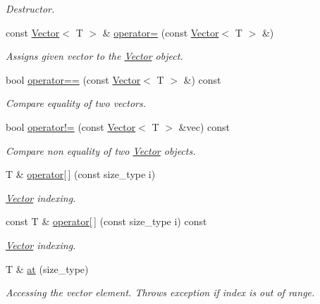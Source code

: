 \begin{DoxyCompactItemize}
\begin{DoxyCompactList}\small\item\em Destructor. \end{DoxyCompactList}\item 
const \hyperlink{classtasks_1_1Vector}{Vector}$<$ T $>$ \& \hyperlink{classtasks_1_1Vector_a20c8cebda6af75951f3c940aff2ccddc}{operator=} (const \hyperlink{classtasks_1_1Vector}{Vector}$<$ T $>$ \&)
\begin{DoxyCompactList}\small\item\em Assigns given vector to the \hyperlink{classtasks_1_1Vector}{Vector} object. \end{DoxyCompactList}\item 
bool \hyperlink{classtasks_1_1Vector_a2f137101daada599ad565736783a3058}{operator==} (const \hyperlink{classtasks_1_1Vector}{Vector}$<$ T $>$ \&) const 
\begin{DoxyCompactList}\small\item\em Compare equality of two vectors. \end{DoxyCompactList}\item 
bool \hyperlink{classtasks_1_1Vector_a74bf7af865841aa86df2c56193514099}{operator!=} (const \hyperlink{classtasks_1_1Vector}{Vector}$<$ T $>$ \&vec) const 
\begin{DoxyCompactList}\small\item\em Compare non equality of two \hyperlink{classtasks_1_1Vector}{Vector} objects. \end{DoxyCompactList}\item 
T \& \hyperlink{classtasks_1_1Vector_a78695c117ca574acbd649a56a88e3a96}{operator\mbox{[}$\,$\mbox{]}} (const size\+\_\+type i)
\begin{DoxyCompactList}\small\item\em \hyperlink{classtasks_1_1Vector}{Vector} indexing. \end{DoxyCompactList}\item 
const T \& \hyperlink{classtasks_1_1Vector_a2880a70e64c32bd59bdf043a9b9386fb}{operator\mbox{[}$\,$\mbox{]}} (const size\+\_\+type i) const 
\begin{DoxyCompactList}\small\item\em \hyperlink{classtasks_1_1Vector}{Vector} indexing. \end{DoxyCompactList}\item 
T \& \hyperlink{classtasks_1_1Vector_afc37a4c54dafcc185b5590e67c408a5d}{at} (size\+\_\+type)
\begin{DoxyCompactList}\small\item\em Accessing the vector element. Throws exception if index is out of range. \end{DoxyCompactList}\item 

\end{DoxyCompactItemize}
